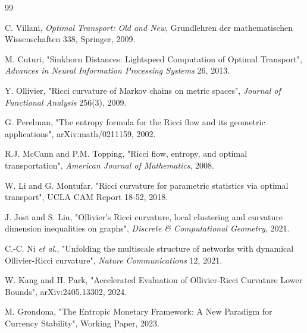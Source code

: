 \documentclass[11pt,a4paper]{article}
\theoremstyle{definition}
\theoremstyle{remark}
\begin{document}
\begin{thebibliography}{99}

C. Villani, \textit{Optimal Transport: Old and New}, Grundlehren der mathematischen Wissenschaften 338, Springer, 2009.

M. Cuturi, "Sinkhorn Distances: Lightspeed Computation of Optimal Transport", \textit{Advances in Neural Information Processing Systems} 26, 2013.

Y. Ollivier, "Ricci curvature of Markov chains on metric spaces", \textit{Journal of Functional Analysis} 256(3), 2009.

G. Perelman, "The entropy formula for the Ricci flow and its geometric applications", arXiv:math/0211159, 2002.

R.J. McCann and P.M. Topping, "Ricci flow, entropy, and optimal transportation", \textit{American Journal of Mathematics}, 2008.

W. Li and G. Montufar, "Ricci curvature for parametric statistics via optimal transport", UCLA CAM Report 18-52, 2018.

J. Jost and S. Liu, "Ollivier's Ricci curvature, local clustering and curvature dimension inequalities on graphs", \textit{Discrete \& Computational Geometry}, 2021.

C.-C. Ni \textit{et al.}, "Unfolding the multiscale structure of networks with dynamical Ollivier-Ricci curvature", \textit{Nature Communications} 12, 2021.

W. Kang and H. Park, "Accelerated Evaluation of Ollivier-Ricci Curvature Lower Bounds", arXiv:2405.13302, 2024.

M. Grondona, "The Entropic Monetary Framework: A New Paradigm for Currency Stability", Working Paper, 2023.

\end{thebibliography}
\end{document}
